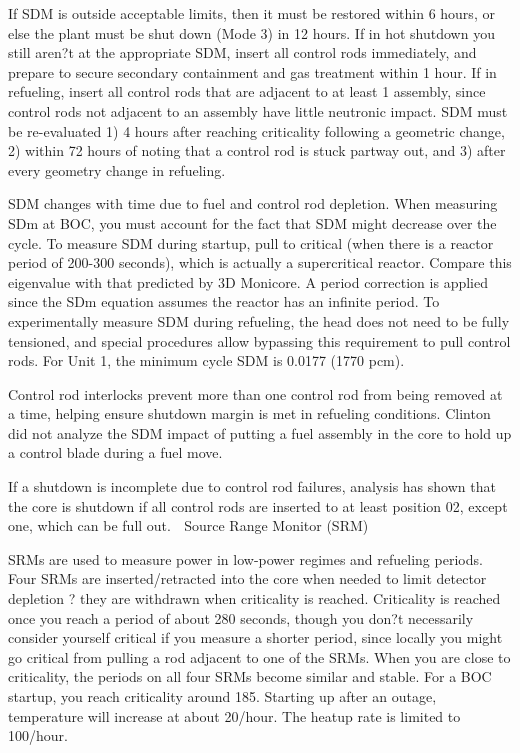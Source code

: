 \documentclass[10pt]{article}
\begin{document}
If SDM is outside acceptable limits, then it must be restored within 6 hours, or else the plant must be shut down (Mode 3) in 12 hours. If in hot shutdown you still aren?t at the appropriate SDM, insert all control rods immediately, and prepare to secure secondary containment and gas treatment within 1 hour. If in refueling, insert all control rods that are adjacent to at least 1 assembly, since control rods not adjacent to an assembly have little neutronic impact. SDM must be re-evaluated 1) 4 hours after reaching criticality following a geometric change, 2) within 72 hours of noting that a control rod is stuck partway out, and 3) after every geometry change in refueling. 

SDM changes with time due to fuel and control rod depletion. When measuring SDm at BOC, you must account for the fact that SDM might decrease over the cycle. To measure SDM during startup, pull to critical (when there is a reactor period of 200-300 seconds), which is actually a supercritical reactor. Compare this eigenvalue with that predicted by 3D Monicore. A period correction is applied since the SDm equation assumes the reactor has an infinite period. To experimentally measure SDM during refueling, the head does not need to be fully tensioned, and special procedures allow bypassing this requirement to pull control rods. For Unit 1, the minimum cycle SDM is 0.0177  (1770 pcm). 

Control rod interlocks prevent more than one control rod from being removed at a time, helping ensure shutdown margin is met in refueling conditions. Clinton did not analyze the SDM impact of putting a fuel assembly in the core to hold up a control blade during a fuel move. 

If a shutdown is incomplete due to control rod failures, analysis has shown that the core is shutdown if all control rods are inserted to at least position 02, except one, which can be full out. 
Source Range Monitor (SRM)

SRMs are used to measure power in low-power regimes and refueling periods. Four SRMs are inserted/retracted into the core when needed to limit detector depletion ? they are withdrawn when criticality is reached. Criticality is reached once you reach a period of about 280 seconds, though you don?t necessarily consider yourself critical if you measure a shorter period, since locally you might go critical from pulling a rod adjacent to one of the SRMs. When you are close to criticality, the periods on all four SRMs become similar and stable. For a BOC startup, you reach criticality around 185. Starting up after an outage, temperature will increase at about 20/hour. The heatup rate is limited to 100/hour. 
\end{document}
